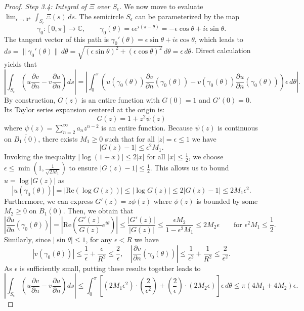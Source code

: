 \documentclass[11pt,twoside]{article} %
\begin{document}
\begin{proof}
\textit{Step 3.4: Integral of $\Xi$ over $S_{\epsilon}$. } We now move to evaluate $\lim_{\epsilon \to 0^+} \int_{S_{\epsilon}} \Xi(s)\,ds$. The semicircle $S_{\epsilon}$ can be parameterized by the map 
$$\gamma_0: [0, \pi] \to \mathbb{C}, \qquad \gamma_0(\theta) = \epsilon e^{i(\pi - \theta)} = -\epsilon\cos\theta + i\epsilon\sin\theta.$$
The tangent vector of this path is $\gamma_0'(\theta) = \epsilon\sin\theta + i\epsilon\cos\theta$, which leads to $ds = \|\gamma_0'(\theta)\| \, d\theta = \sqrt{(\epsilon\sin\theta)^2 + (\epsilon\cos\theta)^2} \, d\theta = \epsilon \, d\theta$. Direct calculation yields that
$$\left| \int_{S_{\epsilon}} \left( u \frac{\partial v}{\partial n} - v \frac{\partial u}{\partial n} \right) ds\right| = \left| \int_0^\pi \left( u(\gamma_0(\theta))\frac{\partial v}{\partial n}(\gamma_0(\theta)) - v(\gamma_0(\theta))\frac{\partial u}{\partial n}(\gamma_0(\theta)) \right) \epsilon \, d\theta \right|.$$
By construction, $G(z)$ is an entire function with $G(0) = 1$ and $G'(0) = 0$. Its Taylor series expansion centered at the origin is:
$$G(z) = 1 + z^2 \psi(z)$$
where $\psi(z) = \sum_{n=2}^\infty a_n z^{n-2}$ is an entire function. Because $\psi(z)$ is continuous on  $\overline{B_1(0)}$, there exists $M_1 \ge 0$ such that for all $|z| = \epsilon \le 1$ we have
$$|G(z) - 1| \le \epsilon^2 M_1.$$
Invoking the inequality $|\log(1+x)| \le 2|x|$ for all $|x| \le \frac{1}{2}$, we choose $\epsilon \le \min\left(1, \frac{1}{\sqrt{2M_1}}\right)$ to ensure $|G(z)-1| \le \frac{1}{2}$. This allows us to bound $u = \log|G(z)|$ as 
$$|u(\gamma_0(\theta))| = \big|\text{Re}(\log G(z))\big| \le \big|\log G(z)\big| \le 2|G(z) - 1| \le 2M_1 \epsilon^2.$$
Furthermore, we can express $G'(z) = z \phi(z)$ where $\phi(z)$ is bounded by some $M_2 \ge 0$ on $\overline{B_1(0)}$. Then, we obtain that $$\left|\frac{\partial u}{\partial n}(\gamma_0(\theta))\right| = \left|\text{Re}\left( \frac{G'(z)}{G(z)} e^{i\theta} \right)\right| \le \frac{|G'(z)|}{|G(z)|} \le \frac{\epsilon M_2}{1 - \epsilon^2 M_1} \le 2M_2 \epsilon \qquad \text{for } \epsilon^2 M_1 \le \frac{1}{2}.$$
Similarly, since $|\sin\theta| \le 1$, for any $\epsilon < R$ we have
$$|v(\gamma_0(\theta))| \le \frac{1}{\epsilon} + \frac{\epsilon}{R^2} \le \frac{2}{\epsilon}, \quad \left|\frac{\partial v}{\partial n}(\gamma_0(\theta))\right| \le \frac{1}{\epsilon^2} + \frac{1}{R^2} \le \frac{2}{\epsilon^2}.$$
As $\epsilon$ is sufficiently small, putting these results together leads to
$$\left| \int_{S_{\epsilon}} \left( u \frac{\partial v}{\partial n} - v \frac{\partial u}{\partial n} \right) ds\right|  \le \int_0^\pi \left[ (2M_1 \epsilon^2) \cdot \left(\frac{2}{\epsilon^2}\right) + \left(\frac{2}{\epsilon}\right) \cdot (2M_2 \epsilon) \right] \epsilon \, d\theta \le \pi (4M_1 + 4M_2) \epsilon.$$

\end{proof}
\end{document}
